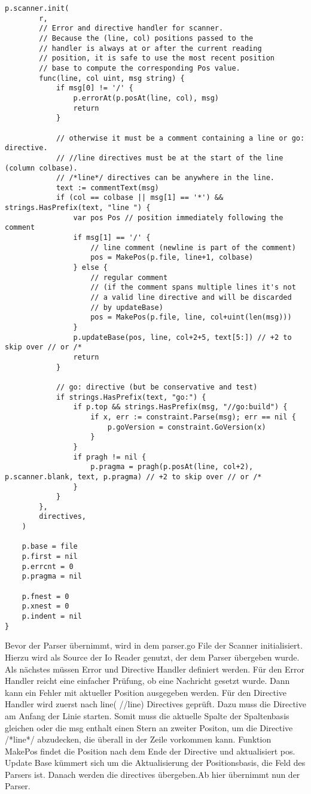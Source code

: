 \begin{lstlisting}
p.scanner.init(
		r,
		// Error and directive handler for scanner.
		// Because the (line, col) positions passed to the
		// handler is always at or after the current reading
		// position, it is safe to use the most recent position
		// base to compute the corresponding Pos value.
		func(line, col uint, msg string) {
			if msg[0] != '/' {
				p.errorAt(p.posAt(line, col), msg)
				return
			}

			// otherwise it must be a comment containing a line or go: directive.
			// //line directives must be at the start of the line (column colbase).
			// /*line*/ directives can be anywhere in the line.
			text := commentText(msg)
			if (col == colbase || msg[1] == '*') && strings.HasPrefix(text, "line ") {
				var pos Pos // position immediately following the comment
				if msg[1] == '/' {
					// line comment (newline is part of the comment)
					pos = MakePos(p.file, line+1, colbase)
				} else {
					// regular comment
					// (if the comment spans multiple lines it's not
					// a valid line directive and will be discarded
					// by updateBase)
					pos = MakePos(p.file, line, col+uint(len(msg)))
				}
				p.updateBase(pos, line, col+2+5, text[5:]) // +2 to skip over // or /*
				return
			}

			// go: directive (but be conservative and test)
			if strings.HasPrefix(text, "go:") {
				if p.top && strings.HasPrefix(msg, "//go:build") {
					if x, err := constraint.Parse(msg); err == nil {
						p.goVersion = constraint.GoVersion(x)
					}
				}
				if pragh != nil {
					p.pragma = pragh(p.posAt(line, col+2), p.scanner.blank, text, p.pragma) // +2 to skip over // or /*
				}
			}
		},
		directives,
	)

	p.base = file
	p.first = nil
	p.errcnt = 0
	p.pragma = nil

	p.fnest = 0
	p.xnest = 0
	p.indent = nil
}
\end{lstlisting}
Bevor der Parser übernimmt, wird in dem parser.go File der Scanner initialisiert. Hierzu wird als Source der Io Reader genutzt, der dem Parser übergeben wurde. Als nächstes müssen Error und Directive Handler definiert werden. Für den Error Handler reicht eine einfacher Prüfung, ob eine Nachricht gesetzt wurde. Dann kann ein Fehler mit aktueller Position ausgegeben werden. Für den Directive Handler wird zuerst nach line( //line) Directives geprüft. Dazu muss die Directive am Anfang der Linie starten. Somit muss die aktuelle Spalte der Spaltenbasis gleichen oder die msg enthalt einen Stern an zweiter Positon, um die Directive /*line*/ abzudecken, die überall in der Zeile vorkommen kann. Funktion MakePos findet die Position nach dem Ende der Directive und aktualisiert pos. Update Base kümmert sich um die Aktualisierung der Positionsbasis, die Feld des Parsers ist. Danach werden die directives übergeben.Ab hier übernimmt nun der Parser.

